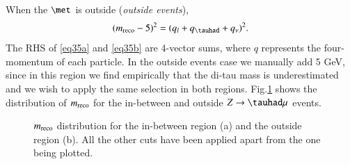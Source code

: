 When the $\met$ is outside (\textit{outside events}),
\begin{equation}
(\mreco-5)^{2}=(q_l+q_{\tauhad}+q_\nu)^2.
\label{eq35b}
\end{equation}
The RHS of \eqref{eq35a} and \eqref{eq35b} are 4-vector sums, where $q$ represents the four-momentum of each particle. In the outside events case we manually add 5 GeV, since in this region we find empirically that the di-tau mass is underestimated and we wish to apply the same selection in both regions. Fig.\ref{Fig4} shows the distribution of $m_{\text{reco}}$ for the in-between and outside $Z\to\tauhad\mu$ events. 
\begin{figure}[htbp]
	\centering
	\hfill
	\caption{$m_{\text{reco}}$ distribution for the in-between region (a) and the outside region (b). All the other cuts have been applied apart from the one being plotted.}
	\label{Fig4}
\end{figure}

